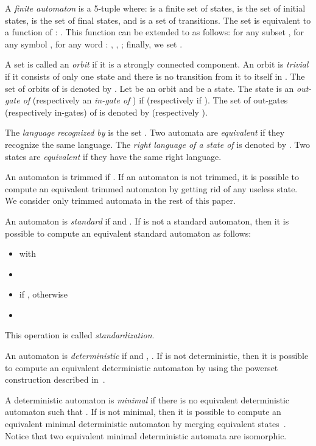 \documentclass{llncs}
\begin{document}
	A \emph{finite automaton}  is a 5-tuple  where:
 is a finite set of states,  is the set of initial states,  is the set of final states, and  is a set of transitions.
The set  is equivalent to a function of  : .
This function can be extended to  as follows: for any subset , for any symbol , for any word : , , ; finally, we set .

	A set  is called an \emph{orbit} if it is a strongly connected component.
An orbit is \emph{trivial} if it consists of only one state and there is no transition from it to itself in .
The set of orbits of  is denoted by .
	Let  be an orbit and  be a state. The state  is an \emph{out-gate of } (respectively an \emph{in-gate of }) if  (respectively if ).
	The set of out-gates (respectively in-gates) of  is denoted by  (respectively ).


	The \emph{language}  \emph{recognized by } is the set .
Two automata are \emph{equivalent} if they recognize the same language.
The \emph{right language of a state  of } is denoted by .
Two states are \emph{equivalent} if they have the same right language.

	An automaton  is trimmed if .
	If an automaton is not trimmed, it is possible to compute an equivalent trimmed automaton by getting rid of any useless state.
	We consider only trimmed automata in the rest of this paper.

	An automaton  is \emph{standard} if  and .
If  is not a standard automaton, then it is possible to compute an equivalent standard automaton  as follows:
\begin{itemize}
	\item  with 
	\item 
	\item  if ,  otherwise
	\item 
\end{itemize}
This operation is called \emph{standardization}.

	An automaton  is \emph{deterministic} if  and , .
	If  is not deterministic, then it is possible to compute an equivalent deterministic automaton by using the powerset construction described in~\cite{RS59}.
	
	A deterministic automaton  is \emph{minimal} if there is no equivalent deterministic automaton  such that .
	If  is not minimal, then it is possible to compute an equivalent minimal deterministic automaton by merging equivalent states~\cite{Hop71,Moo56}.
	Notice that two equivalent minimal deterministic automata are isomorphic.
\end{document}
